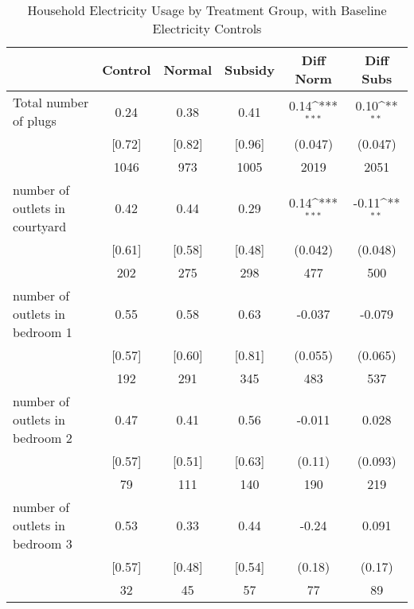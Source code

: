\begin{table}[htbp]\centering
\def\sym#1{\ifmmode^{#1}\else\(^{#1}\)\fi}
\caption{Household Electricity Usage by Treatment Group, with Baseline Electricity Controls \label{tab:"balance"}}
\begin{tabular*}{0.9\hsize}{@{\hskip\tabcolsep\extracolsep\fill}l*{1}{ccccc}}
\toprule
                                &  Control&   Normal&  Subsidy&Diff Norm         &Diff Subs         \\
\midrule
Total number of plugs           &     0.24&     0.38&     0.41&     0.14\sym{***}&     0.10\sym{**} \\
                                &   [0.72]&   [0.82]&   [0.96]&  (0.047)         &  (0.047)         \\
                                &     1046&      973&     1005&     2019         &     2051         \\
number of outlets in courtyard  &     0.42&     0.44&     0.29&     0.14\sym{***}&    -0.11\sym{**} \\
                                &   [0.61]&   [0.58]&   [0.48]&  (0.042)         &  (0.048)         \\
                                &      202&      275&      298&      477         &      500         \\
number of outlets in bedroom 1  &     0.55&     0.58&     0.63&   -0.037         &   -0.079         \\
                                &   [0.57]&   [0.60]&   [0.81]&  (0.055)         &  (0.065)         \\
                                &      192&      291&      345&      483         &      537         \\
number of outlets in bedroom 2  &     0.47&     0.41&     0.56&   -0.011         &    0.028         \\
                                &   [0.57]&   [0.51]&   [0.63]&   (0.11)         &  (0.093)         \\
                                &       79&      111&      140&      190         &      219         \\
number of outlets in bedroom 3  &     0.53&     0.33&     0.44&    -0.24         &    0.091         \\
                                &   [0.57]&   [0.48]&   [0.54]&   (0.18)         &   (0.17)         \\
                                &       32&       45&       57&       77         &       89         \\

\end{tabular*}
\end{table}
